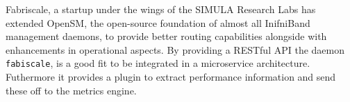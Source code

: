 Fabriscale, a startup under the wings of the SIMULA Research Labs has extended OpenSM, the open-source foundation of
almost all InifniBand management daemons, to provide better routing capabilities alongside with enhancements in operational aspects.
By providing a RESTful API the daemon \texttt{fabiscale}, is a good fit to be integrated in a microservice architecture. Futhermore it
provides a plugin to extract performance information and send these off to the metrics engine.
